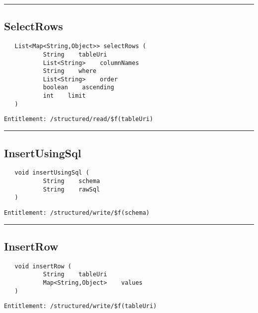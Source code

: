 \rule{12cm}{2pt}
\subsection{SelectRows}
\label{Api:SelectRows}
\begin{verbatim}
   List<Map<String,Object>> selectRows (
           String    tableUri
           List<String>    columnNames
           String    where
           List<String>    order
           boolean    ascending
           int    limit
   )
\end{verbatim}
\begin{Verbatim}[fontsize=\small, formatcom=\color{Maroon}]
  Entitlement: /structured/read/$f(tableUri)
\end{Verbatim}



\rule{12cm}{2pt}
\subsection{InsertUsingSql}
\label{Api:InsertUsingSql}
\begin{verbatim}
   void insertUsingSql (
           String    schema
           String    rawSql
   )
\end{verbatim}
\begin{Verbatim}[fontsize=\small, formatcom=\color{Maroon}]
  Entitlement: /structured/write/$f(schema)
\end{Verbatim}



\rule{12cm}{2pt}
\subsection{InsertRow}
\label{Api:InsertRow}
\begin{verbatim}
   void insertRow (
           String    tableUri
           Map<String,Object>    values
   )
\end{verbatim}
\begin{Verbatim}[fontsize=\small, formatcom=\color{Maroon}]
  Entitlement: /structured/write/$f(tableUri)
\end{Verbatim}




